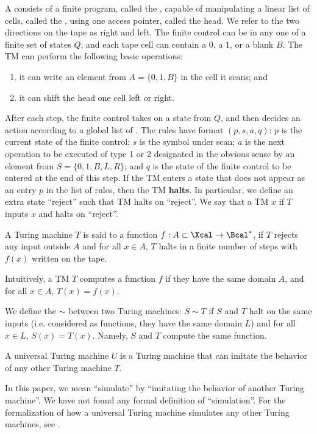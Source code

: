 \begin{definition}
A  consists of a finite program, called the , capable of manipulating a linear list of cells, called the , using one access pointer, called the head. We refer to the two directions on the tape as right and left. The finite control can be in any one of a finite set of states $Q$, and each tape cell can contain a $0$, a $1$, or a blank $B$.
The TM can perform the following basic operations:
\begin{enumerate}
    \item  it can write an element from $A = \{0, 1, B\}$ in the cell it scans; and
    \item it can shift the head one cell left or right.
\end{enumerate}
After each step, the finite control takes on a state from $Q$, and then decides an action according to a global list of . The rules have format $(p, s, a, q)$: $p$ is the current state of the finite control; $s$ is the symbol under scan; $a$ is the next operation to be executed of type 1 or 2 designated in the obvious sense by an element from $S = \{0, 1, B, L, R\}$; and $q$ is the state of the finite control to be entered at the end of this step. If the TM enters a state that does not appear as an entry $p$ in the list of rules, then the TM \textbf{halts}. In particular, we define an extra state ``reject'' such that TM halts on ``reject''. We say that a TM  $x$ if $T$ inputs $x$ and halts on ``reject''.
\end{definition}
\begin{definition}\label{def:compute_formal}
    A Turing machine $T$ is said to  a function $f: A\subset \Xcal \to \Bcal^*$, if $T$ rejects any input outside $A$ and for all $x\in A$, $T$ halts in a finite number of steps with $f(x)$ written on the tape.
\end{definition}
Intuitively, a TM $T$ computes a function $f$ if they have the same domain $A$, and for all $x\in A$, $T(x)=f(x)$.
\begin{definition}
    We define the  $\sim$ between two Turing machines: $S\sim T$ if $S$ and $T$ halt on the same inputs (i.e. considered as functions, they have the same domain $L$) and for all $x\in L$, $S(x)=T(x)$. Namely, $S$ and $T$ compute the same function.
\end{definition}
\begin{definition}[informal]\citep{li2019introduction}
    A universal Turing machine $U$ is a Turing machine that can imitate the behavior of any other Turing machine $T$.
\end{definition}
In this paper, we mean ``simulate'' by ``imitating the behavior of another Turing machine''. We have not found any formal definition of ``simulation''. For the formalization of how a universal Turing machine simulates any other Turing machines, see \cite{hennie1966two}.

